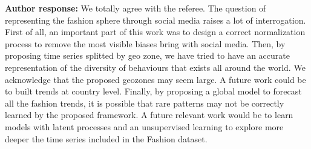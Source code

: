 \documentclass[10pt]{article} %
\begin{document}
\begin{itemize}
	\textbf{Author response:} We totally agree with the referee. The question of representing the fashion sphere through social media raises a lot of interrogation. First of all, an important part of this work was to design a correct normalization process to remove the most visible biases bring with social media. Then, by proposing time series splitted by geo zone, we have tried to have an accurate representation of the diversity of behaviours that exists all around the world. We acknowledge that the proposed geozones may seem large. A future work could be to built trends at country level. Finally, by proposing a global model to forecast all the fashion trends, it is possible that rare patterns may not be correctly learned by the proposed framework. A future relevant work would be to learn models with latent processes and an unsupervised learning to explore more deeper the time series included in the Fashion dataset.\\	
\end{itemize}



\end{document}
